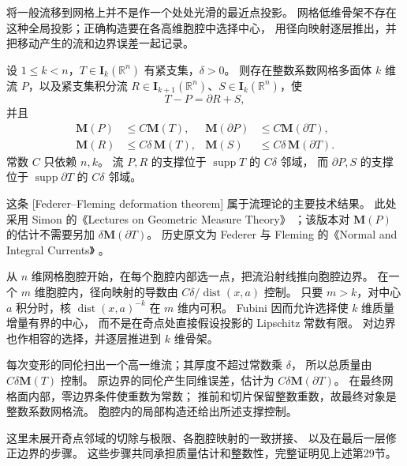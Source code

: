 \ProseParagraphBreak

将一般流移到网格上并不是作一个处处光滑的最近点投影。
网格低维骨架不存在这种全局投影；正确构造要在各高维胞腔中选择中心，
用径向映射逐层推出，并把移动产生的流和边界误差一起记录。

\begin{theorem}\label{b1:thm:app-d-deformation}
设 \(1\leq k<n\)，\(T\in\mathbf I_k(\mathbb R^n)\) 有紧支集，\(\delta>0\)。
则存在整数系数网格多面体 \(k\) 维流 \(P\)，以及紧支集积分流
\(R\in\mathbf I_{k+1}(\mathbb R^n)\)、\(S\in\mathbf I_k(\mathbb R^n)\)，使
\[
 T-P=\partial R+S,
\]
并且
\[
 \begin{aligned}
 \mathbf M(P)&\leq C\mathbf M(T),&
 \mathbf M(\partial P)&\leq C\mathbf M(\partial T),\\
 \mathbf M(R)&\leq C\delta\,\mathbf M(T),&
 \mathbf M(S)&\leq C\delta\,\mathbf M(\partial T).
 \end{aligned}
\]
常数 \(C\) 只依赖 \(n,k\)。
流 \(P,R\) 的支撑位于 \(\operatorname{supp}T\) 的 \(C\delta\) 邻域，
而 \(\partial P,S\) 的支撑位于 \(\operatorname{supp}\partial T\) 的 \(C\delta\) 邻域。
\end{theorem}

这条%
[Federer--Fleming deformation theorem]%
属于流理论的主要技术结果。
此处采用 Simon 的《Lectures on Geometric Measure Theory》%
\cite[29.1 THEOREM and 29.3 COROLLARY]{Simon1983Lectures}；该版本对 \(\mathbf M(P)\)
的估计不需要另加 \(\delta\mathbf M(\partial T)\)。
历史原文为 Federer 与 Fleming 的《Normal and Integral Currents》%
\cite{FedererFleming1960Normal}。

\begin{proofsketch}
从 \(n\) 维网格胞腔开始，在每个胞腔内部选一点，把流沿射线推向胞腔边界。
在一个 \(m\) 维胞腔内，径向映射的导数由
\(C\delta/\operatorname{dist}(x,a)\) 控制。
只要 \(m>k\)，对中心 \(a\) 积分时，核
\(\operatorname{dist}(x,a)^{-k}\) 在 \(m\) 维内可积。
Fubini 因而允许选择使 \(k\) 维质量增量有界的中心，
而不是在奇点处直接假设投影的 Lipschitz 常数有限。
对边界也作相容的选择，并逐层推进到 \(k\) 维骨架。

每次变形的同伦扫出一个高一维流；其厚度不超过常数乘 \(\delta\)，
所以总质量由 \(C\delta\mathbf M(T)\) 控制。
原边界的同伦产生同维误差，估计为 \(C\delta\mathbf M(\partial T)\)。
在最终网格面内部，零边界条件使重数为常数；
推前和切片保留整数重数，故最终对象是整数系数网格流。
胞腔内的局部构造还给出所述支撑控制。

这里未展开奇点邻域的切除与极限、各胞腔映射的一致拼接、
以及在最后一层修正边界的步骤。
这些步骤共同承担质量估计和整数性，完整证明见上述第29节。
\end{proofsketch}

